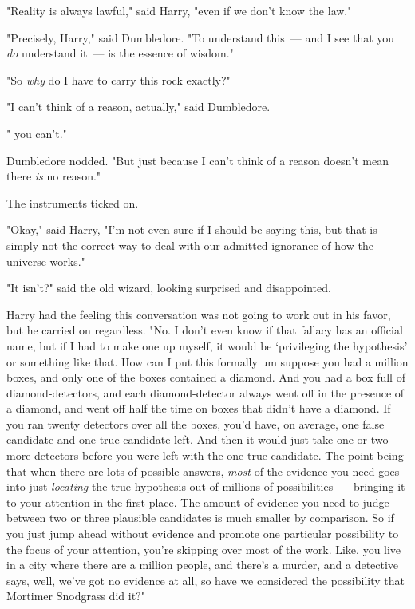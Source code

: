 "Reality is always lawful," said Harry, "even if we don't know the law."

"Precisely, Harry," said Dumbledore. "To understand this~--- and I see that you
\emph{do} understand it~--- is the essence of wisdom."

"So{\el} \emph{why} do I have to carry this rock exactly?"

"I can't think of a reason, actually," said Dumbledore.

"{\el} you can't."

Dumbledore nodded. "But just because I can't think of a reason doesn't mean
there \emph{is} no reason."

The instruments ticked on.

"Okay," said Harry, "I'm not even sure if I should be saying this, but that is
simply not the correct way to deal with our admitted ignorance of how the
universe works."

"It isn't?" said the old wizard, looking surprised and disappointed.

Harry had the feeling this conversation was not going to work out in his
favor, but he carried on regardless. "No. I don't even know if that fallacy
has an official name, but if I had to make one up myself, it would be
`privileging the hypothesis' or something like that. How can I put this
formally{\el} um{\el} suppose you had a million boxes, and only one of
the boxes contained a diamond. And you had a box full of diamond-detectors, and
each diamond-detector always went off in the presence of a diamond, and went
off half the time on boxes that didn't have a diamond. If you ran twenty
detectors over all the boxes, you'd have, on average, one false candidate and
one true candidate left. And then it would just take one or two more detectors
before you were left with the one true candidate. The point being that when
there are lots of possible answers, \emph{most} of the evidence you need goes
into just \emph{locating} the true hypothesis out of millions of
possibilities~--- bringing it to your attention in the first place. The amount of
evidence you need to judge between two or three plausible candidates is much
smaller by comparison. So if you just jump ahead without evidence and promote
one particular possibility to the focus of your attention, you're skipping over
most of the work. Like, you live in a city where there are a million people,
and there's a murder, and a detective says, well, we've got no evidence at all,
so have we considered the possibility that Mortimer Snodgrass did it?"

